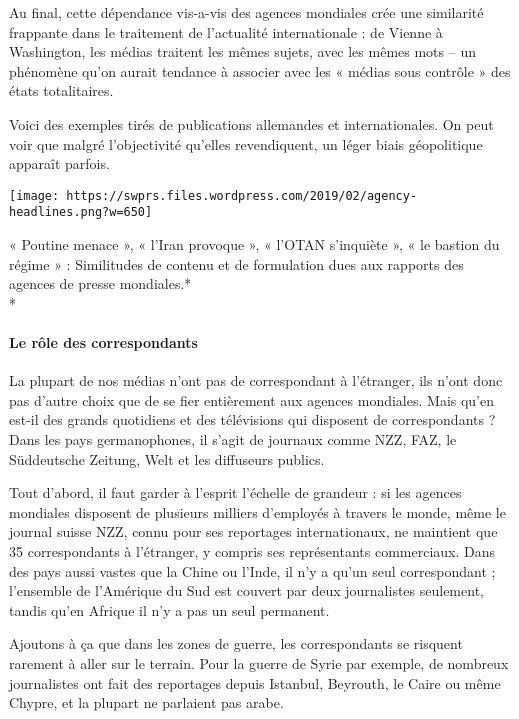 Au final, cette dépendance vis-a-vis des agences mondiales crée une
similarité frappante dans le traitement de l'actualité internationale :
de Vienne à Washington, les médias traitent les mêmes sujets, avec les
mêmes mots -- un phénomène qu'on aurait tendance à associer avec les «
médias sous contrôle » des états totalitaires.

Voici des exemples tirés de publications allemandes et internationales.
On peut voir que malgré l'objectivité qu'elles revendiquent, un léger
biais géopolitique apparaît parfois.

\texttt{[image: https://swprs.files.wordpress.com/2019/02/agency-headlines.png?w=650]}

« Poutine menace », « l'Iran provoque », « l'OTAN s'inquiète », « le
bastion du régime » : Similitudes de contenu et de formulation dues aux
rapports des agences de presse mondiales.*\\
*

\hypertarget{le-ruxf4le-des-correspondants}{%
\paragraph{Le rôle des
correspondants}\label{le-ruxf4le-des-correspondants}}

La plupart de nos médias n'ont pas de correspondant à l'étranger, ils
n'ont donc pas d'autre choix que de se fier entièrement aux agences
mondiales. Mais qu'en est-il des grands quotidiens et des télévisions
qui disposent de correspondants ? Dans les pays germanophones, il s'agit
de journaux comme NZZ, FAZ, le Süddeutsche Zeitung, Welt et les
diffuseurs publics.

Tout d'abord, il faut garder à l'esprit l'échelle de grandeur : si les
agences mondiales disposent de plusieurs milliers d'employés à travers
le monde, même le journal suisse NZZ, connu pour ses reportages
internationaux, ne maintient que 35 correspondants à l'étranger, y
compris ses représentants commerciaux. Dans des pays aussi vastes que la
Chine ou l'Inde, il n'y a qu'un seul correspondant ; l'ensemble de
l'Amérique du Sud est couvert par deux journalistes seulement, tandis
qu'en Afrique il n'y a pas un seul permanent.

Ajoutons à ça que dans les zones de guerre, les correspondants se
risquent rarement à aller sur le terrain. Pour la guerre de Syrie par
exemple, de nombreux journalistes ont fait des reportages depuis
Istanbul, Beyrouth, le Caire ou même Chypre, et la plupart ne parlaient
pas arabe.

